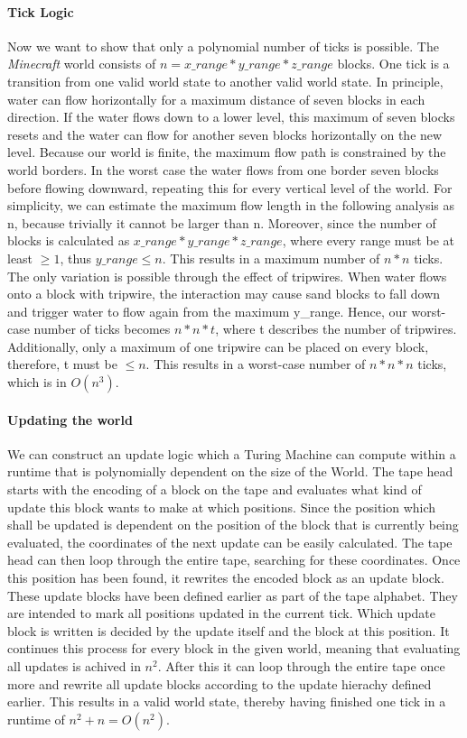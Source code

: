 	\paragraph{Tick Logic}
	Now we want to show that only a polynomial number of ticks is possible.
    \newline The \textit{Minecraft} world consists of $n = x\_range * y\_range * z\_range$ blocks. One tick is a transition from one valid world state to another valid world state. In principle, water can flow horizontally for a maximum distance of seven blocks in each direction. If the water flows down to a lower level, this maximum of seven blocks resets and the water can flow for another seven blocks horizontally on the new level. Because our world is finite, the maximum flow path is constrained by the world borders. In the worst case the water flows from one border seven blocks before flowing downward, repeating this for every vertical level of the world. For simplicity, we can estimate the maximum flow length in the following analysis as n, because trivially it cannot be larger than n. Moreover, since the number of blocks is calculated as $x\_range * y\_range * z\_range$, where every range must be at least $\geq 1$, thus $y\_range \leq n$. This results in a maximum number of $n * n$ ticks. The only variation is possible through the effect of tripwires. When water flows onto a block with tripwire, the interaction may cause sand blocks to fall down and trigger water to flow again from the maximum y\_range. Hence, our worst-case number of ticks becomes $n * n * t$, where t describes the number of tripwires. Additionally, only a maximum of one tripwire can be placed on every block, therefore, t must be $\leq n$. This results in a worst-case number of $n * n * n$ ticks, which is in $O(n^{3})$.
	
	\pagebreak
	\paragraph{Updating the world} \label{updating}
	We can construct an update logic which a Turing Machine can compute within a runtime that is polynomially dependent on the size of the World.
	The tape head starts with the encoding of a block on the tape and evaluates what kind of update this block wants to make at which positions.
	Since the position which shall be updated is dependent on the position of the block that is currently being evaluated, the coordinates of the next update can be easily calculated.
	The tape head can then loop through the entire tape, searching for these coordinates.
	Once this position has been found, it rewrites the encoded block as an update block.
	These update blocks have been defined earlier as part of the tape alphabet. They are intended to mark all positions updated in the current tick.
	Which update block is written is decided by the update itself and the block at this position.
	It continues this process for every block in the given world, meaning that evaluating all updates is achived in $n^2$.
	After this it can loop through the entire tape once more and rewrite all update blocks according to the update hierachy defined earlier.
	This results in a valid world state, thereby having finished one tick in a runtime of $n^{2} + n = O(n^{2})$.
 

